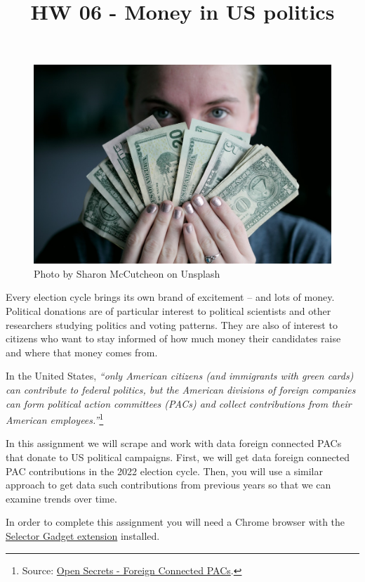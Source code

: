 \documentclass[
]{article}
\title{HW 06 - Money in US politics}
\author{}
\date{\vspace{-2.5em}}
\begin{document}
\maketitle

{
\setcounter{tocdepth}{2}
\tableofcontents
}
\begin{figure}
\includegraphics[width=0.8\linewidth]{img/sharon-mccutcheon-rItGZ4vquWk-unsplash} \caption{Photo by Sharon McCutcheon on Unsplash}\label{fig:photo}
\end{figure}

Every election cycle brings its own brand of excitement -- and lots of
money. Political donations are of particular interest to political
scientists and other researchers studying politics and voting patterns.
They are also of interest to citizens who want to stay informed of how
much money their candidates raise and where that money comes from.

In the United States, \emph{``only American citizens (and immigrants
with green cards) can contribute to federal politics, but the American
divisions of foreign companies can form political action committees
(PACs) and collect contributions from their American
employees.''}\footnote{Source:
  \href{https://www.opensecrets.org/political-action-committees-pacs/foreign-connected-pacs}{Open
  Secrets - Foreign Connected PACs}.}

In this assignment we will scrape and work with data foreign connected
PACs that donate to US political campaigns. First, we will get data
foreign connected PAC contributions in the 2022 election cycle. Then,
you will use a similar approach to get data such contributions from
previous years so that we can examine trends over time.

In order to complete this assignment you will need a Chrome browser with
the \href{http://selectorgadget.com/}{Selector Gadget extension}
installed.
\end{document}
